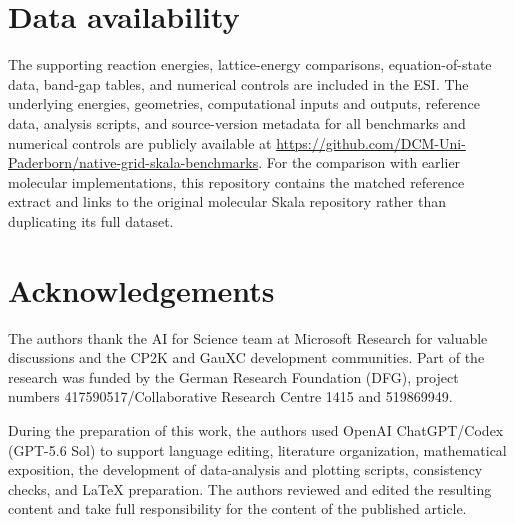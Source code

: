 \documentclass[10pt,a4paper,twocolumn]{article}
\begin{document}
\section*{Data availability}
\label{sec:data-availability}
The supporting reaction energies, lattice-energy comparisons, equation-of-state data, band-gap tables, and numerical controls are included in the ESI. The underlying energies, geometries, computational inputs and outputs, reference data, analysis scripts, and source-version metadata for all benchmarks and numerical controls are publicly available at \url{https://github.com/DCM-Uni-Paderborn/native-grid-skala-benchmarks}. For the comparison with earlier molecular implementations, this repository contains the matched reference extract and links to the original molecular Skala repository rather than duplicating its full dataset.

\section*{Acknowledgements}
The authors thank the AI for Science team at Microsoft Research for valuable discussions and the CP2K and GauXC development communities. Part of the research was funded by the German Research Foundation (DFG), project numbers 417590517/Collaborative Research Centre 1415 and 519869949.

During the preparation of this work, the authors used OpenAI ChatGPT/Codex (GPT-5.6 Sol) to support language editing, literature organization, mathematical exposition, the development of data-analysis and plotting scripts, consistency checks, and LaTeX preparation. The authors reviewed and edited the resulting content and take full responsibility for the content of the published article.



\end{document}
